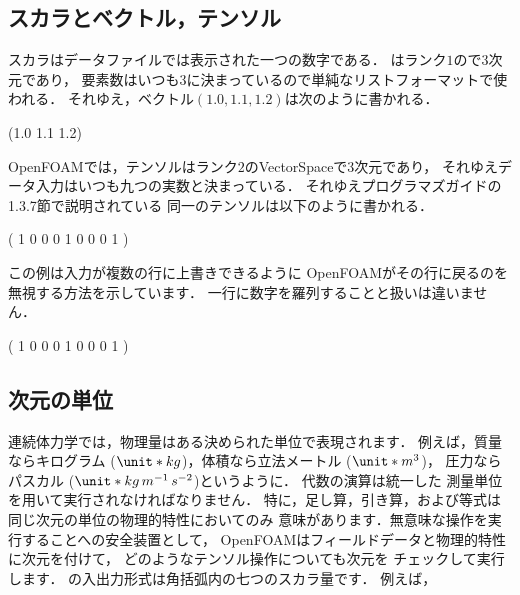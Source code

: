 \subsection{スカラとベクトル，テンソル}
\label{ssec:4.2.5}
スカラはデータファイルでは表示された一つの数字である．
%
%
はランク$1$ので3次元であり，
要素数はいつも$3$に決まっているので単純なリストフォーマットで使われる．
それゆえ，ベクトル$(1.0, 1.1, 1.2)$は次のように書かれる．
\begin{OFverbatim}[file]
(1.0 1.1 1.2)
\end{OFverbatim}
OpenFOAMでは，テンソルはランク$2$のVectorSpaceで3\nobreak 次元であり，
それゆえデータ入力はいつも九つの実数と決まっている．
それゆえプログラマズガイドの1.3.7節で説明されている
同一のテンソルは以下のように書かれる．
\begin{OFverbatim}[file]
(
    1 0 0
    0 1 0
    0 0 1
)
\end{OFverbatim}
この例は入力が複数の行に上書きできるように
OpenFOAMがその行に戻るのを無視する方法を示しています．
一行に数字を羅列することと扱いは違いません．
\begin{OFverbatim}[file]
( 1 0 0 0 1 0 0 0 1 )
\end{OFverbatim}


\subsection{次元の単位}
\label{ssec:4.2.6}
%
連続体力学では，物理量はある決められた単位で表現されます．
例えば，質量ならキログラム ($\unit*{kg}$)，体積なら立法メートル ($\unit*{m^{3}}$)，
圧力ならパスカル ($\unit*{kg\,m^{-1}\,s^{-2}}$)というように．
代数の演算は統一した
%
測量単位を用いて実行されなければなりません．
特に，足し算，引き算，および等式は同じ次元の単位の物理的特性においてのみ
意味があります．無意味な操作を実行することへの安全装置として，
OpenFOAMはフィールドデータと物理的特性に次元を付けて，
どのようなテンソル操作についても次元を
%
チェックして実行します．
の入出力形式は角括弧内の七つのスカラ量です．
例えば，
\begin{OFverbatim}[file]
[0 2 -1 0 0 0 0]
\end{OFverbatim}

